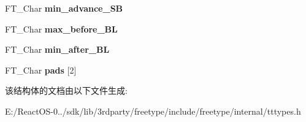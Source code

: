 \begin{DoxyCompactItemize}
\item 
\mbox{\label{struct_t_t___s_bit___line_metrics_rec___ad4f4578a99ce4537bd454bf47a60074c}} 
F\+T\+\_\+\+Char {\bfseries min\+\_\+advance\+\_\+\+SB}
\item 
\mbox{\label{struct_t_t___s_bit___line_metrics_rec___a63599b9adfc64d1927b6a8b46d9ce08d}} 
F\+T\+\_\+\+Char {\bfseries max\+\_\+before\+\_\+\+BL}
\item 
\mbox{\label{struct_t_t___s_bit___line_metrics_rec___a553dfe17d98fd138430545f4f77195c5}} 
F\+T\+\_\+\+Char {\bfseries min\+\_\+after\+\_\+\+BL}
\item 
\mbox{\label{struct_t_t___s_bit___line_metrics_rec___a9f98e5de39f252b6ebfb3e94120d1dbc}} 
F\+T\+\_\+\+Char {\bfseries pads} \mbox{[}2\mbox{]}
\end{DoxyCompactItemize}


该结构体的文档由以下文件生成\+:\begin{DoxyCompactItemize}
\item 
E\+:/\+React\+O\+S-\/0../sdk/lib/3rdparty/freetype/include/freetype/internal/tttypes.\+h\end{DoxyCompactItemize}
